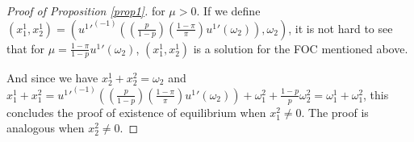 \documentclass[pdftex]{article}
\numberwithin{equation}{section}
\theoremstyle{th}
\newtheorem{proof lemma}{{Proof Lemma}.}
\theoremstyle{definition}
\newtheorem*{risk lovers}{Risk lovers}
\newtheorem*{risk averse}{Risk averse}
\begin{document}
{\begin{proof}[Proof of Proposition \ref{prop1}]
for $\mu>0$. If we define $\left(x^1_1,x^1_2\right)=\left({{u^1}'}^{\left(-1\right)}\left(\left(\frac{p}{1-p}\right)\left(\frac{1-\pi}{\pi}\right){u^1}'\left(\omega_2\right)\right),\omega_2\right)$, it is not hard to see that for $\mu=\frac{1-\pi}{1-p}{u^1}'(\omega_2)$, $\left(x^1_1,x^1_2\right)$ is a solution for the FOC mentioned above.
%
%

And since  we have $x^1_2+x^2_2=\omega_2$ and $x^1_1+x^2_1={{u^1}'}^{\left(-1\right)}\left(\left(\frac{p}{1-p}\right)\left(\frac{1-\pi}{\pi}\right){u^1}'\left(\omega_2\right)\right)+\omega_1^2+\frac{1-p}{p}\omega_2^2=\omega_1^1+\omega^2_1$, this concludes the proof of existence of equilibrium when $x^2_1\neq0$. The proof is analogous when $x^2_2\neq0$.


\end{proof}}
\end{document}
